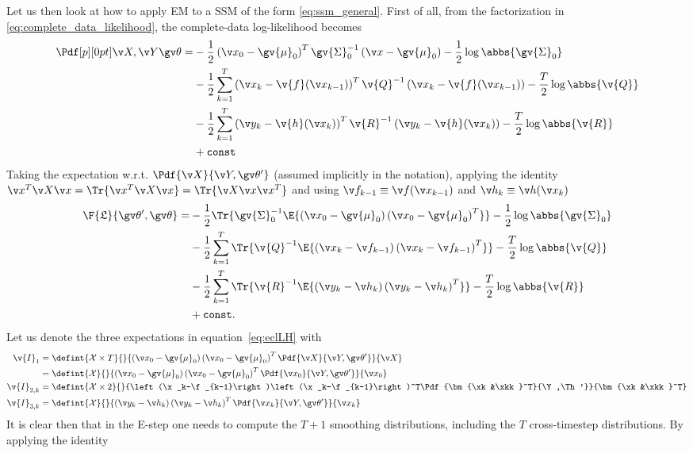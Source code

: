 Let us then look at how to apply EM to a SSM of the form \eqref{eq:ssm_general}. First of
all, from the factorization in \eqref{eq:complete_data_likelihood}, the complete-data log-likelihood becomes
\begin{align*}
\begin{split}
	\cLH =&-\frac{1}{2}\left(\x_0-\gv{\mu}_0\right)^T\gv{\Sigma}_0^{-1}\left(\x-\gv{\mu}_0\right)-\frac{1}{2}\log\abbs{\gv{\Sigma}_0}\\
	&-\frac{1}{2}\sum_{k=1}^T\left(\x_k-\v{f}(\x_{k-1})\right)^T\v{Q}^{-1}\left(\x_k-\v{f}(\x_{k-1})\right)-\frac{T}{2}\log\abbs{\v{Q}}\\
	&-\frac{1}{2}\sum_{k=1}^T\left(\y_k-\v{h}(\x_{k})\right)^T\v{R}^{-1}\left(\y_k-\v{h}(\x_{k})\right)-\frac{T}{2}\log\abbs{\v{R}}\\
	&+\mathtt{const}
\end{split}
\end{align*}
Taking the expectation w.r.t. $\Pdf{\X}{\Y,\Th'}$ (assumed implicitly in the notation), applying the identity $\x^T\X\x=\Tr{\x^T\X\x}=\Tr{\X\x\x^T}$
and using $\f_{k-1}\equiv \f(\x_{k-1})$ and $\h_k\equiv \h(\x_k)$
\begin{align}
\begin{split}
	\F{\Lb}{\Th',\Th} =&-\frac{1}{2}\Tr{\gv{\Sigma}_0^{-1}\E{\left(\x_0-\gv{\mu}_0\right)\left(\x_0-\gv{\mu}_0\right)^T}}-\frac{1}{2}\log\abbs{\gv{\Sigma}_0}\\
	&-\frac{1}{2}\sum_{k=1}^T\Tr{\v{Q}^{-1}\E{\left(\x_k-\f_{k-1}\right)\left(\x_k-\f_{k-1}\right)^T}}-\frac{T}{2}\log\abbs{\v{Q}}\\
	&-\frac{1}{2}\sum_{k=1}^T\Tr{\v{R}^{-1}\E{\left(\y_k-\h_{k}\right)\left(\y_k-\h_{k}\right)^T}}-\frac{T}{2}\log\abbs{\v{R}}\\
	&+\mathtt{const}.
\end{split}
\label{eq:eclLH}
\end{align} 
Let us denote the three expectations in equation~\eqref{eq:eclLH} with
\begin{align}
	\v{I}_1 &= \defint{\mathcal{X}\times T}{}{\left(\x_0-\gv{\mu}_0\right)\left(\x_0-\gv{\mu}_0\right)^T\Pdf{\X}{\Y,\Th'}}{\X}\nonumber\\
	&= 	\defint{\mathcal{X}}{}{\left(\x_0-\gv{\mu}_0\right)\left(\x_0-\gv{\mu}_0\right)^T\Pdf{\x_0}{\Y,\Th'}}{\x_0}\\
	\v{I}_{2,k} &= \defint{\mathcal{X}\times 2}{}{\left(\x_k-\f_{k-1}\right)\left(\x_k-\f_{k-1}\right)^T\Pdf{\bm{\xk&\xkk}^T}{\Y,\Th'}}{\bm{\xk&\xkk}^T}\\
	\v{I}_{3,k} &= \defint{\mathcal{X}}{}{\left(\y_k-\h_{k}\right)\left(\y_k-\h_{k}\right)^T\Pdf{\xk}{\Y,\Th'}}{\xk}
\end{align}
It is clear then that in the E-step one needs to compute the $T+1$ smoothing
distributions, including the $T$ cross-timestep distributions.
By applying the identity


